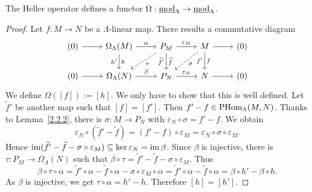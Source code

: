 
\begin{proposition}\label{2.2.5}
The Heller operator defines a functor $\Omega:\underline{\operatorname{mod}}_\Lambda\to\underline{\operatorname{mod}}_\Lambda$.
\end{proposition}


\begin{proof}
Let $f:M\to N$ be a $\Lambda$-linear map. There results a commutative diagram
\[
\begin{tikzcd}
	(0)\ar[r] & \Omega_\Lambda(M)\rar["\alpha"] \ar[d,"h", "h'"'] & P_M\rar["\varepsilon_M"] \ar[d, "\widetilde f","\widetilde f'"']\ar[dl,dashed, "\tau"] & M\ar[r]\ar[d, "f", "f'"']\ar[dl,dashed, "\sigma"] & (0) \\
	(0)\ar[r] & \Omega_\Lambda(N)\rar["\beta"] & P_N\rar["\varepsilon_N"] & N\ar[r] & (0)
\end{tikzcd}
\]
%
We define $\Omega([f]):=[h]$. We only have to show that this is well defined. Let $\widetilde f'$ be another map such that $[f]=[f']$. Then $f'-f\in \operatorname{PHom}_\Lambda(M,N)$. Thanks to Lemma~\ref{2.2.2}, there is $\sigma:M\to P_N$ with $\varepsilon_N\circ \sigma = f'-f$. We obtain
\[
\varepsilon_N\circ ( \widetilde{f}'-\widetilde{f}) = (f'-f)\circ \varepsilon_M
= \varepsilon_N \circ \sigma\circ \varepsilon_M.
\]
Hence $\operatorname{im}(\widetilde{f}'-\widetilde{f}-\sigma\circ \varepsilon_M)\subseteq\ker\varepsilon_N = \operatorname{im}\beta$. Since $\beta$ is injective, there is $\tau:P_M\to\Omega_\Lambda(N)$ such that $\beta\circ\tau=\widetilde{f}'-\widetilde{f}-\sigma\circ \varepsilon_M$. Thus
\[
\beta \circ \tau \circ \alpha
 = \widetilde{f}'\circ \alpha-\widetilde{f}\circ \alpha-\sigma\circ \varepsilon_M\circ \alpha
 = \widetilde{f}'\circ \alpha-\widetilde{f}\circ \alpha
 = \beta \circ h' - \beta \circ h.
\]
As $\beta$ is injective, we get $\tau\circ\alpha = h'-h$. Therefore $[h]=[h']$.
\end{proof}

